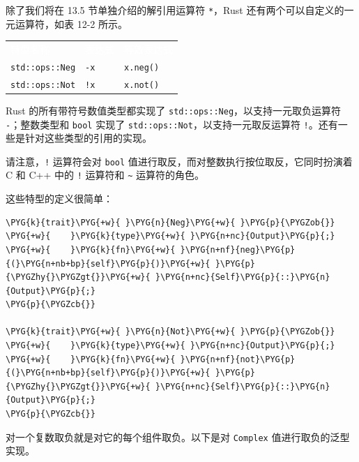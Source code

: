 除了我们将在 13.5 节单独介绍的解引用运算符 \texttt{*}，Rust 还有两个可以自定义的一元运算符，如表 12-2 所示。


\myTableBegin
\begin{tabularx}{\textwidth}{@{}>{\hsize=1.148\hsize\raggedright\arraybackslash}X>{\hsize=0.861\hsize\raggedright\arraybackslash}X>{\hsize=0.991\hsize\raggedright\arraybackslash}X@{}}
\rowcolor{tabhead}\textcolor{white}{特型名称} & \textcolor{white}{表达式} & \textcolor{white}{等效表达式} \\
\texttt{std::ops::Neg} & \texttt{-x} & \texttt{x.neg()} \\
\texttt{std::ops::Not} & \texttt{!x} & \texttt{x.not()} \\
\end{tabularx}
\myTableEnd

Rust 的所有带符号数值类型都实现了 \texttt{std::ops::Neg}，以支持一元取负运算符 \texttt{-}；整数类型和 \texttt{bool} 实现了 \texttt{std::ops::Not}，以支持一元取反运算符 \texttt{!}。还有一些是针对这些类型的引用的实现。

请注意，\texttt{!} 运算符会对 \texttt{bool} 值进行取反，而对整数执行按位取反，它同时扮演着 C 和 C++ 中的 \texttt{!} 运算符和 \texttt{\textasciitilde{}} 运算符的角色。

这些特型的定义很简单：

\begin{Verbatim}[commandchars=\\\{\},breaklines=true,breakanywhere=true,fontsize=\codefont,xleftmargin=17bp]
\PYG{k}{trait}\PYG{+w}{ }\PYG{n}{Neg}\PYG{+w}{ }\PYG{p}{\PYGZob{}}
\PYG{+w}{    }\PYG{k}{type}\PYG{+w}{ }\PYG{n+nc}{Output}\PYG{p}{;}
\PYG{+w}{    }\PYG{k}{fn}\PYG{+w}{ }\PYG{n+nf}{neg}\PYG{p}{(}\PYG{n+nb+bp}{self}\PYG{p}{)}\PYG{+w}{ }\PYG{p}{\PYGZhy{}\PYGZgt{}}\PYG{+w}{ }\PYG{n+nc}{Self}\PYG{p}{::}\PYG{n}{Output}\PYG{p}{;}
\PYG{p}{\PYGZcb{}}

\PYG{k}{trait}\PYG{+w}{ }\PYG{n}{Not}\PYG{+w}{ }\PYG{p}{\PYGZob{}}
\PYG{+w}{    }\PYG{k}{type}\PYG{+w}{ }\PYG{n+nc}{Output}\PYG{p}{;}
\PYG{+w}{    }\PYG{k}{fn}\PYG{+w}{ }\PYG{n+nf}{not}\PYG{p}{(}\PYG{n+nb+bp}{self}\PYG{p}{)}\PYG{+w}{ }\PYG{p}{\PYGZhy{}\PYGZgt{}}\PYG{+w}{ }\PYG{n+nc}{Self}\PYG{p}{::}\PYG{n}{Output}\PYG{p}{;}
\PYG{p}{\PYGZcb{}}
\end{Verbatim}

对一个复数取负就是对它的每个组件取负。以下是对 \texttt{Complex} 值进行取负的泛型实现。

